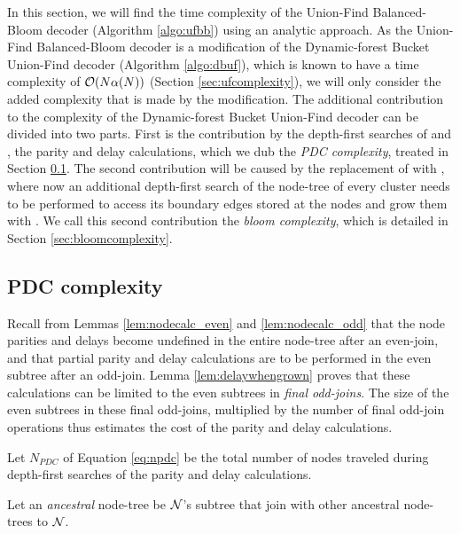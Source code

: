 In this section, we will find the time complexity of the Union-Find Balanced-Bloom decoder (Algorithm \ref{algo:ufbb}) using an analytic approach. As the Union-Find Balanced-Bloom decoder is a modification of the Dynamic-forest Bucket Union-Find decoder (Algorithm \ref{algo:dbuf}), which is known to have a time complexity of $\mathcal{O}(N\alpha(N))$ (Section \ref{sec:ufcomplexity}), we will only consider the added complexity that is made by the modification. The additional contribution to the complexity of the Dynamic-forest Bucket Union-Find decoder can be divided into two parts. First is the contribution by the depth-first searches of  and , the parity and delay calculations, which we dub the \emph{PDC complexity}, treated in Section \ref{sec:pdfcomplexity}. The second contribution will be caused by the replacement of  with , where now an additional depth-first search of the node-tree of every cluster needs to be performed to access its boundary edges stored at the nodes and grow them with . We call this second contribution the \emph{bloom complexity}, which is detailed in Section \ref{sec:bloomcomplexity}.

\subsection{PDC complexity}\label{sec:pdfcomplexity}
Recall from Lemmas \ref{lem:nodecalc_even} and \ref{lem:nodecalc_odd} that the node parities and delays become undefined in the entire node-tree after an even-join, and that partial parity and delay calculations are to be performed in the even subtree after an odd-join. Lemma \ref{lem:delaywhengrown} proves that these calculations can be limited to the even subtrees in \emph{final odd-joins}. The size of the even subtrees in these final odd-joins, multiplied by the number of final odd-join operations thus estimates the cost of the parity and delay calculations. 
\begin{definition}\label{def:npdc}
  Let $N_{PDC}$ of Equation \eqref{eq:npdc} be the total number of nodes traveled during depth-first searches of the parity and delay calculations.
\end{definition}
\begin{definition}\label{def:ancestral}
  Let an \emph{ancestral} node-tree be $\mathcal{N}$'s subtree that join with other ancestral node-trees to $\mathcal{N}$.
\end{definition}

